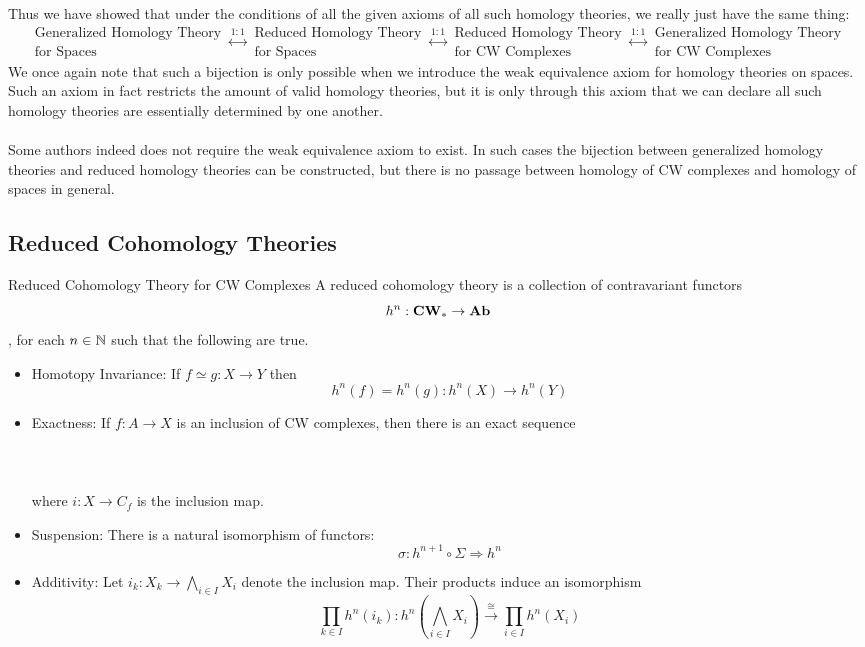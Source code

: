 \documentclass[a4paper]{article}
\begin{document}
Thus we have showed that under the conditions of all the given axioms of all such homology theories, we really just have the same thing: $$\substack{\text{Generalized  Homology Theory}\\\text{for Spaces}}\overset{1:1}{\longleftrightarrow}\substack{\text{Reduced Homology Theory}\\\text{for Spaces}}\overset{1:1}{\longleftrightarrow}\substack{\text{Reduced Homology Theory}\\\text{for CW Complexes}}\overset{1:1}{\longleftrightarrow}\substack{\text{Generalized Homology Theory}\\\text{for CW Complexes}}$$ We once again note that such a bijection is only possible when we introduce the weak equivalence axiom for homology theories on spaces. Such an axiom in fact restricts the amount of valid homology theories, but it is only through this axiom that we can declare all such homology theories are essentially determined by one another. \\~\\

Some authors indeed does not require the weak equivalence axiom to exist. In such cases the bijection between generalized homology theories and reduced homology theories can be constructed, but there is no passage between homology of CW complexes and homology of spaces in general. 

\subsection{Reduced Cohomology Theories}
\begin{defn}{Reduced Cohomology Theory for CW Complexes}{} A reduced cohomology theory is a collection of contravariant functors $$h^n:\bold{CW}_\ast\to\bold{Ab}$$, for each $n\in\mathbb{N}$ such that the following are true. 
\begin{itemize}
\item Homotopy Invariance: If $f\simeq g:X\to Y$ then $$h^n(f)=h^n(g):h^n(X)\to h^n(Y)$$
\item Exactness: If $f:A\to X$ is an inclusion of CW complexes, then there is an exact sequence \\~\\
\\~\\
where $i:X\to C_f$ is the inclusion map. 
\item Suspension: There is a natural isomorphism of functors: $$\sigma:h^{n+1}\circ\Sigma\Rightarrow h^n$$
\item Additivity: Let $i_k:X_k\to\bigwedge_{i\in I}X_i$ denote the inclusion map. Their products induce an isomorphism $$\prod_{k\in I}h^n(i_k):h^n\left(\bigwedge_{i\in I}X_i\right)\overset{\cong}{\longrightarrow}\prod_{i\in I}h^n(X_i)$$
\end{itemize}
\end{defn}
\end{document}
